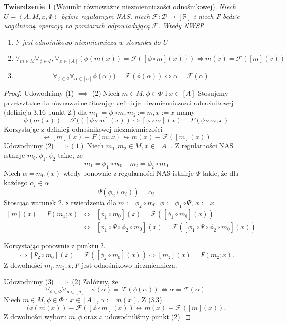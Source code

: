 \documentclass[12pt,a4paper]{report}
\newtheorem{tw}[definition]{Twierdzenie}
\newcommand{\domkniecie}[1]{\left\lbrack{#1}\right\rbrack}
\newcommand{\tuple}[1]{\left\langle {#1} \right\rangle}
\begin{document}
\begin{tw}[Warunki równoważne niezmienniczości odnośnikowej]
Niech $U=\tuple{A,M,a,\Phi}$ będzie regularnym NAS, niech $\mathcal{F}:\mathcal{D}\to \domkniecie{\mathbb{R}}$ i niech $F$ będzie uogólnioną operacją na pomiarach odpowiadającą $\mathcal{F}$. Wtedy
NWSR
\begin{enumerate}
\item
$F$ jest odnośnikowo niezmiennicza w stosunku do $U$
\item
$$
\forall_{m \in M}\forall_{\phi \in \Phi},\forall_{x \in \domkniecie{A}} 
(\phi(m(x))=\mathcal{F}( \domkniecie{\phi \circ m}(x))) \iff m(x)=\mathcal{F}(\domkniecie{m}(x))
$$
\item
$$
\forall_{\phi \in \Phi}\forall_{\alpha \in \domkniecie{a}} \phi(\alpha))=\mathcal{F}(\phi(\alpha)) \iff \alpha=\mathcal{F}(\alpha).
$$
\end{enumerate}

\end{tw}
\begin{proof}
Udowodnimy (1) $\implies$ (2)
Niech $m\in M, \phi \in \Phi$ i $x\in \domkniecie{A}$
Stosujemy przekształcenia równoważne
Stosując definicje niezmienniczości odnośnikowej (definicja 3.16 punkt 2.) dla $m_1:=\phi\circ m, m_2:=m, x:=x$ mamy
$$
\phi(m(x))=\mathcal{F}((\domkniecie{\phi \circ m}(x)) \iff \domkniecie{\phi \circ m}(x)=F(\phi \circ m;x) 
$$
Korzystając z definicji odnośnikowej niezmienniczości
$$
\iff \domkniecie{m}(x)=F(m;x) \iff m(x)=\mathcal{F}(\domkniecie{m}(x))
$$
Udowodnimy (2) $\implies (1)$
Niech $m_1,m_2 \in M, x\in \domkniecie{A}$. Z regularności NAS istnieje $m_0, \phi_1,\phi_2$ takie, że
$$ 
m_1=\phi_1\circ m_0 \quad m_2=\phi_2\circ m_0
$$
Niech $\alpha=m_0(x)$ wtedy ponownie z regularności NAS istnieje $\Psi$ takie, że dla każdego $\alpha_i \in \alpha$
$$
\Psi(\phi_2(\alpha_i))=\alpha_i
$$
Stosując warunek 2. z twierdzenia dla $m:=\phi_2 \circ m_0$, $\phi:=\phi_1\circ \Psi$, $x:=x$
\begin{eqnarray*}
\domkniecie{m}(x)=F(m_1;x) & \iff  & \domkniecie{\phi_1\circ m_0}(x)=\mathcal{F}(\domkniecie{\phi_1 \circ m_0}(x))\\
&  \iff & \domkniecie{\phi_1\circ\Psi\circ\phi_2\circ m_0}(x)=\mathcal{F}(\domkniecie{\phi_1\circ\Psi\circ\phi_2\circ m_0}(x)) 
\end{eqnarray*}

Korzystając ponownie z punktu 2.
$$
\iff \domkniecie{\Psi_2\circ m_0}(x)=\mathcal{F}(\domkniecie{\phi_2\circ m_0}(x)) \iff \domkniecie{m_2}(x)=F(m_2;x).
$$
Z dowolności $m_1, m_2, x, F$ jest odnośnikowo niezmiennicza.

Udowodnimy (3) $\implies$ (2)
Załóżmy, że
\begin{equation}
\forall_{\phi \in \Phi}\forall_{\alpha \in \domkniecie{a}}\quad \phi(\alpha)=\mathcal{F}(\phi(\alpha)) \iff \alpha=\mathcal{F}(\alpha).
\end{equation}
Niech $m\in M, \phi\in \Phi$ i $x\in \domkniecie{A}$, $\alpha:= m(x)$. Z (3.3)
$$
(\phi(m(x))=\mathcal{F}(\domkniecie{\phi\circ m}(x)) \iff m(x)=\mathcal{F}(\domkniecie{m}(x)).
$$
Z dowolności wyboru $m, \phi$ oraz $x$ udowodniliśmy punkt (2).
\end{proof}
\end{document}
